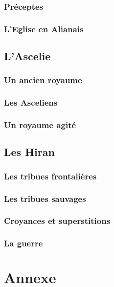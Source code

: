 \documentclass[10pt,a4paper,twocolumn]{book}
\begin{document}
\section{Préceptes}
\section{L'Eglise en Alianais}
\chapter{L'Ascelie}
\section{Un ancien royaume}
\section{Les Asceliens}
\section{Un royaume agité}

\chapter{Les Hiran}
\section{Les tribues frontalières}
\section{Les tribues sauvages}
\section{Croyances et superstitions}
\section{La guerre}
\part*{Annexe}
\tableofcontents
\end{document}
